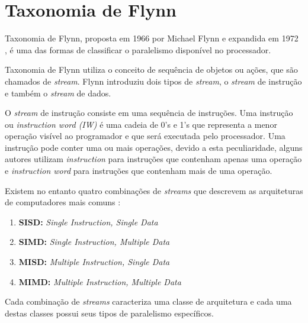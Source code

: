 \chapter{Taxonomia de Flynn}

Taxonomia de Flynn, proposta em 1966 \cite{Flynn:1966} por Michael 
Flynn e expandida em 1972 \cite{Flynn:1972}, é uma das formas de classificar o 
paralelismo disponível no processador.  

Taxonomia de Flynn utiliza o conceito de sequência de objetos ou ações, que são
chamados de \textit{stream}.
Flynn introduziu dois tipos de \textit{stream}, o 
\textit{stream} de instrução e também o \textit{stream} de dados. 

O \textit{stream} de instrução consiste em uma sequência de instruções. 
Uma instrução ou \textit{instruction word (IW)} é uma cadeia de 0's e 1's que 
representa a menor operação visível ao programador e que será executada pelo 
processador. 
Uma instrução pode conter uma ou mais operações, devido a esta peculiaridade,
alguns autores utilizam \textit{instruction} para instruções que contenham 
apenas uma operação e \textit{instruction word} para instruções que contenham 
mais de uma operação.

\begin{comment}
Processadores escalares (\textit{scalar processors}) e processadores
superescalares (\textit{superscalar processors}) executam uma ou mais
\textit{instructions} por ciclo de \textit{clock} da máquina. 
\end{comment}

Existem no entanto quatro combinações de \textit{streams} que descrevem as 
arquiteturas de computadores mais comuns \cite{Flynn:1996}:

\begin{enumerate}
        \item \textbf{SISD:} \textit{Single Instruction, Single Data}
        \item \textbf{SIMD:} \textit{Single Instruction, Multiple Data}
        \item \textbf{MISD:} \textit{Multiple Instruction, Single Data}
        \item \textbf{MIMD:} \textit{Multiple Instruction, Multiple Data}
\end{enumerate}

Cada combinação de \textit{streams} caracteriza uma classe de arquitetura 
e cada uma destas classes possui seus tipos de paralelismo específicos.


